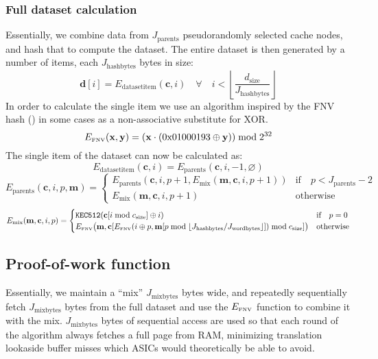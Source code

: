 \documentclass[9pt,oneside]{amsart}
\begin{document}
\subsubsection{Full dataset calculation} \label{dataset}
Essentially, we combine data from $J_{\mathrm{parents}}$ pseudorandomly selected cache nodes, and hash that to compute the dataset. The entire dataset is then generated by a number of items, each $J_{\mathrm{hashbytes}}$ bytes in size:
\begin{equation}
 \mathbf{d}[i] = E_{\mathrm{datasetitem}}(\mathbf{c}, i) \quad \forall \quad i < \left\lfloor\frac{d_{\mathrm{size}}}{J_{\mathrm{hashbytes}}}\right\rfloor
\end{equation}
In order to calculate the single item we use an algorithm inspired by the FNV hash (\cite{FowlerNollVo1991FNVHash}) in some cases as a non-associative substitute for XOR.
\begin{equation}
 E_\text{\tiny FNV}(\mathbf{x}, \mathbf{y}) = (\mathbf{x} \cdot (\mathrm{0x01000193} \oplus \mathbf{y})) \bmod 2^{32}
\end{equation}
The single item of the dataset can now be calculated as:
\begin{equation}
 E_{\mathrm{datasetitem}}(\mathbf{c}, i) = E_{\mathrm{parents}}(\mathbf{c}, i, -1, \varnothing)
\end{equation}
\begin{equation}
  E_{\mathrm{parents}}(\mathbf{c}, i, p, \mathbf{m}) = \begin{cases}
E_{\mathrm{parents}}(\mathbf{c}, i, p +1, E_{\mathrm{mix}}(\mathbf{m}, \mathbf{c}, i, p + 1)) & \text{if} \quad p < J_{\mathrm{parents}} -2 \\
E_{\mathrm{mix}}(\mathbf{m}, \mathbf{c}, i, p + 1) & \text{otherwise}
\end{cases}
\end{equation}
\begin{equation}
 E_{\mathrm{mix}}(\mathbf{m}, \mathbf{c}, i, p) = \begin{cases}
\texttt{KEC512}(\mathbf{c}[i \bmod c_\mathrm{{size}}] \oplus i) & \text{if} \quad p = 0 \\
E_\text{\tiny FNV}\big(\mathbf{m}, \mathbf{c}[E_\text{\tiny FNV}(i \oplus p, \mathbf{m}[p \bmod \lfloor J_{\mathrm{hashbytes}} / J_{\mathrm{wordbytes}} \rfloor]) \bmod c_{\mathrm{size}}] \big) & \text{otherwise}
\end{cases}
\end{equation}

\subsection{Proof-of-work function}
Essentially, we maintain a ``mix'' $J_{\mathrm{mixbytes}}$ bytes wide, and repeatedly sequentially fetch $J_{\mathrm{mixbytes}}$ bytes from the full dataset and use the $E_\text{\tiny FNV}$ function to combine it with the mix. $J_{\mathrm{mixbytes}}$ bytes of sequential access are used so that each round of the algorithm always fetches a full page from RAM, minimizing translation lookaside buffer misses which ASICs would theoretically be able to avoid.
\end{document}
